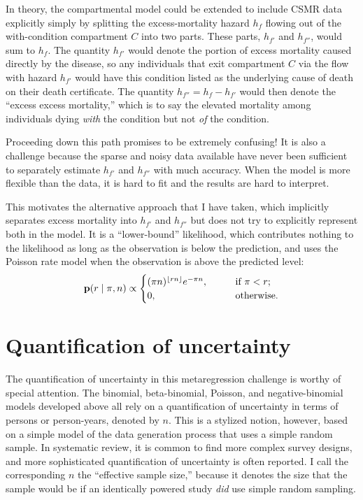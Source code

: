 In theory, the compartmental model could be extended to include CSMR
data explicitly simply by splitting the excess-mortality hazard $h_f$ flowing out
of the with-condition compartment $C$ into two parts.  These parts,
$h_{f'}$ and $h_{f''}$, would sum to $h_f$. The quantity $h_{f'}$ would denote the portion of
excess mortality caused directly by the disease, so any individuals
that exit compartment $C$ via the flow with hazard $h_{f'}$ would have this condition
listed as the underlying cause of death on their death certificate.
The quantity $h_{f''} = h_{f} - h_{f'}$ would then denote the ``excess excess mortality,''
which is to say the elevated mortality among individuals dying
\emph{with} the condition but not \emph{of} the condition.

Proceeding down this path promises to be extremely confusing!  It is
also a challenge because the sparse and noisy data available have
never been sufficient to separately estimate $h_{f'}$ and $h_{f''}$ with much
accuracy.  When the model is more flexible than the data, it is hard
to fit and the results are hard to interpret.

This motivates the alternative approach that I have taken, which
implicitly separates excess mortality into $h_{f'}$ and $h_{f''}$ but does
not try to explicitly represent both in the model.  It is a
``lower-bound'' likelihood, which contributes nothing to the likelihood as
long as the observation is below the prediction, and uses the Poisson
rate model when the observation is above the predicted level:
\[
\mathbf{p}(r \;|\; \pi,n) \propto
\begin{cases}
(\pi n)^{\lfloor rn\rfloor} e^{-\pi n}, &\qquad\text{if } \pi < r;\\
  0, &\qquad\text{otherwise.}
\end{cases}
\]

\section{Quantification of uncertainty}
The quantification of uncertainty in this metaregression challenge is
worthy of special attention.  The binomial, beta-binomial, Poisson,
and negative-binomial models developed above all rely on a
quantification of uncertainty in terms of persons or person-years,
denoted by $n$.  This is a stylized notion, however, based on a simple
model of the data generation process that uses a simple random sample.
In systematic review, it is common to find more complex survey
designs, and more sophisticated quantification of uncertainty is often
reported.  I call the corresponding $n$ the ``effective sample size,''
because it denotes the size that the sample would be if an identically
powered study \emph{did} use simple random sampling.

